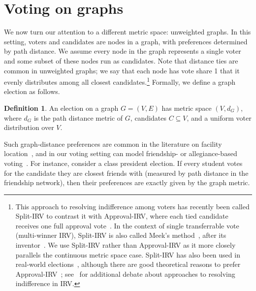 \documentclass{article}
\theoremstyle{theorem}
\theoremstyle{definition}
\newtheorem{definition}{Definition}
\begin{document}
\section{Voting on graphs}
We now turn our attention to a different metric space: unweighted graphs. In this setting, voters and candidates are nodes in a graph, with preferences determined by path distance. We assume every node in the graph represents a single voter and some subset of these nodes run as candidates. Note that distance ties are common in unweighted graphs; we say that each node has vote share 1 that it evenly distributes among all closest candidates.\footnote{This approach to resolving indifference among voters has recently been called Split-IRV to contrast it with Approval-IRV, where each tied candidate receives one full approval vote~\cite{delemazure2024generalizing}. In the context of single transferrable vote (multi-winner IRV), Split-IRV is also called Meek's method~\cite{hill1987algorithm}, after its inventor~\cite{meek1969nouvelle,meek1994new}. We use Split-IRV rather than Approval-IRV as it more closely parallels the continuous metric space case. Split-IRV has also been used in real-world elections~\cite{mollison2023fair}, although there are good theoretical reasons to prefer Approval-IRV~\cite{delemazure2024generalizing}; see~\cite{hill2005meek} for additional debate about approaches to resolving indifference in IRV.} Formally, we define a graph election as follows. 

\begin{definition}
  An election on a graph $G = (V, E)$ has metric space $(V, d_G)$, where $d_G$ is the path distance metric of $G$, candidates $C \subseteq V$, and a uniform voter distribution over $V$.  
\end{definition}




Such graph-distance preferences are common in the literature on facility location~\cite{wendell1981new,bandelt1985networks,hansen1986equivalence}, and in our voting setting can model friendship- or allegiance-based voting~\cite{telek2016power}. For instance, consider a class president election. If every student votes for the candidate they are closest friends with (measured by path distance in the friendship network), then their preferences are exactly given by the graph metric. 
\end{document}
